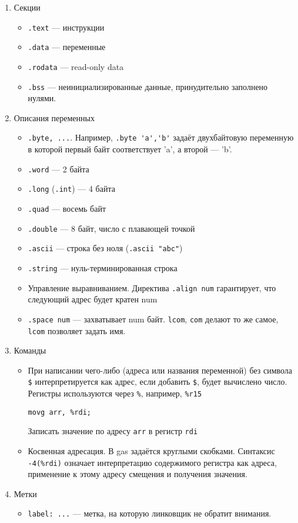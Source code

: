 \begin{enumerate}
\item Секции
\begin{itemize}
\item \verb!.text! --- инструкции
\item \verb!.data! --- переменные
\item \verb!.rodata! --- read-only data
\item \verb!.bss! --- неинициализированные данные, принудительно заполнено нулями.
\end{itemize}
\item Описания переменных
\begin{itemize}
\item \verb!.byte, ...!. Например, \verb!.byte 'a','b'! задаёт двухбайтовую переменную в которой первый байт соответствует 'a', а второй --- 'b'.
\item \verb!.word! --- 2 байта
\item \verb!.long! (\verb!.int!) --- 4 байта
\item \verb!.quad! --- восемь байт
\item \verb!.double! --- 8 байт, число с плавающей точкой
\item \verb!.ascii! --- строка без ноля (\verb!.ascii "abc"!)
\item \verb!.string! --- нуль-терминированная строка
\item Управление выравниванием. Директива \verb!.align num! гарантирует, что следующий адрес будет кратен num
\item \verb!.space num! --- захватывает num байт. \verb!lcom!, \verb!com! делают то же самое, \verb!lcom! позволяет задать имя.
\end{itemize}
\item Команды
\begin{itemize}
\item При написании чего-либо (адреса или названия переменной) без символа \verb!$! интерпретируется как адрес, если добавить \verb!$!, будет вычислено число. Регистры используются через \verb!%!, например, \verb!%r15!
\begin{verbatim}
movg arr, %rdi;
\end{verbatim}
Записать значение по адресу \verb!arr! в регистр \verb!rdi!
\item Косвенная адресация. В gas задаётся круглыми скобками. Синтаксис \verb!-4(%rdi)! означает интерпретацию содержимого регистра как адреса, применение к этому адресу смещения и получения значения.
\end{itemize}
\item Метки
\begin{itemize}
\item \verb!label: ...! --- метка, на которую линковщик не обратит внимания.

\end{itemize}
\end{enumerate}
